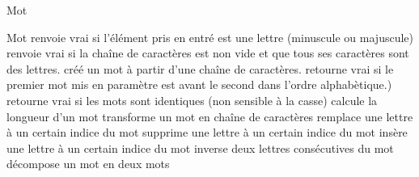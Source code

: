 \begin{tad}
	\tadDependances{\chaine, \naturelNonNul, \caractere, \booleen}
	\begin{tadOperations}{Mot}
			{\tadUnParam{\caractere}}%
			{\tadUnParam{\booleen}}
			{\tadUnParam{\chaine}}%
			{\tadUnParam{\booleen}}
			{\tadUnParam{\chaine}}%
			{}
			{}%
			{\tadUnParam{\booleen}}
			{}%
			{\tadUnParam{\booleen}}
			{}%
			{}
			{}%
			{\tadUnParam{\chaine}}
			{}%
			{}
			{}%
			{}
			{}%
			{}
			{}%
			{}
			{}%
			{}
	\end{tadOperations}
	
	\begin{tadSemantiques}{Mot}
			{renvoie vrai si l'\'el\'ement pris en entr\'e est une lettre (minuscule ou majuscule)}
			{renvoie vrai si la chaîne de caract\`eres est non vide et que tous ses caract\`eres sont des lettres.}
			{cr\'e\'e un mot \`a partir d’une cha\^ine de caract\`eres.}
			{retourne vrai si le premier mot mis en param\`etre est avant le second dans l'ordre alphab\`etique.)}
			{retourne vrai si les mots sont identiques (non sensible à la casse)}
			{calcule la longueur d'un mot}
			{transforme un mot en cha\^ine de caract\`eres}
			{remplace une lettre \`a un certain indice du mot}
			{supprime une lettre \`a un certain indice du mot}
			{ins\`ere une lettre \`a un certain indice du mot}
			{inverse deux lettres cons\'ecutives du mot}
			{décompose un mot en deux mots}
	\end{tadSemantiques}
	

\end{tad}
